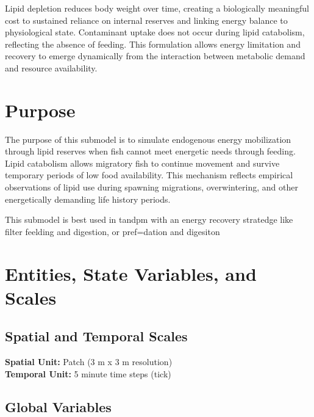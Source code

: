 \documentclass[
]{book}
\begin{document}
Lipid depletion reduces body weight over time, creating a biologically meaningful cost to sustained reliance on internal reserves and linking energy balance to physiological state. Contaminant uptake does not occur during lipid catabolism, reflecting the absence of feeding. This formulation allows energy limitation and recovery to emerge dynamically from the interaction between metabolic demand and resource availability.

\section{Purpose}\label{purpose-5}

The purpose of this submodel is to simulate endogenous energy mobilization through lipid reserves when fish cannot meet energetic needs through feeding. Lipid catabolism allows migratory fish to continue movement and survive temporary periods of low food availability. This mechanism reflects empirical observations of lipid use during spawning migrations, overwintering, and other energetically demanding life history periods.

This submodel is best used in tandpm with an energy recovery stratedge like filter feelding and digestion, or pref=dation and digesiton

\section{Entities, State Variables, and Scales}\label{entities-state-variables-and-scales-6}

\subsection{Spatial and Temporal Scales}\label{spatial-and-temporal-scales-6}

\textbf{Spatial Unit:} Patch (3 m x 3 m resolution)\\
\textbf{Temporal Unit:} 5 minute time steps (tick)

\subsection{\texorpdfstring{\textbf{Global Variables}}{Global Variables}}\label{global-variables-6}
\end{document}
